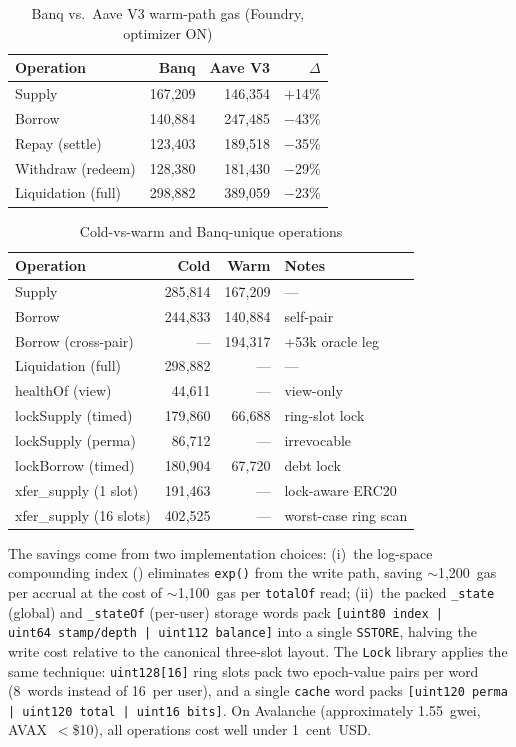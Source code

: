 \documentclass[10pt,a4paper,twocolumn]{article}
\begin{document}
\begin{table}[htbp]
\centering
\caption{Banq vs.\ Aave V3 warm-path gas (Foundry, optimizer ON)}
\label{tab:gas-comparison}
\small
\begin{tabularx}{0.95\columnwidth}{@{}X rrr@{}}
\toprule
Operation & Banq & Aave V3 & $\Delta$ \\
\midrule
Supply             & 167{,}209 & 146{,}354 & $+$14\% \\
Borrow             & 140{,}884 & 247{,}485 & $-$43\% \\
Repay (settle)     & 123{,}403 & 189{,}518 & $-$35\% \\
Withdraw (redeem)  & 128{,}380 & 181{,}430 & $-$29\% \\
Liquidation (full) & 298{,}882 & 389{,}059 & $-$23\% \\
\bottomrule
\end{tabularx}
\end{table}

\begin{table}[htbp]
\centering
\caption{Cold-vs-warm and Banq-unique operations}
\label{tab:gas-cold-warm}
\small
\begin{tabularx}{0.95\columnwidth}{@{}X rrl@{}}
\toprule
Operation & Cold & Warm & Notes \\
\midrule
Supply             & 285{,}814 & 167{,}209 & --- \\
Borrow             & 244{,}833 & 140{,}884 & self-pair \\
Borrow (cross-pair) & ---       & 194{,}317 & +53k oracle leg \\
Liquidation (full) & 298{,}882 & ---       & --- \\
healthOf (view)    & 44{,}611  & ---       & view-only \\
lockSupply (timed)  & 179{,}860 & 66{,}688 & ring-slot lock \\
lockSupply (perma)  & 86{,}712  & ---      & irrevocable \\
lockBorrow (timed)  & 180{,}904 & 67{,}720 & debt lock \\
xfer\_supply (1 slot) & 191{,}463 & --- & lock-aware ERC20 \\
xfer\_supply (16 slots) & 402{,}525 & --- & worst-case ring scan \\
\bottomrule
\end{tabularx}
\end{table}

The savings come from two implementation choices: (i)~the log-space compounding index (\cite{log}) eliminates \texttt{exp()} from the write path, saving $\sim$1{,}200~gas per accrual at the cost of $\sim$1{,}100~gas per \texttt{totalOf} read; (ii)~the packed \texttt{\_state} (global) and \texttt{\_stateOf} (per-user) storage words pack \texttt{[uint80~index | uint64~stamp/depth | uint112~balance]} into a single \texttt{SSTORE}, halving the write cost relative to the canonical three-slot layout. The \texttt{Lock} library applies the same technique: \texttt{uint128[16]} ring slots pack two epoch-value pairs per word (8~words instead of 16~per user), and a single \texttt{cache} word packs \texttt{[uint120~perma | uint120~total | uint16~bits]}. On Avalanche (approximately 1.55~gwei, AVAX~$<$\$10), all operations cost well under 1~cent~USD.
\end{document}
